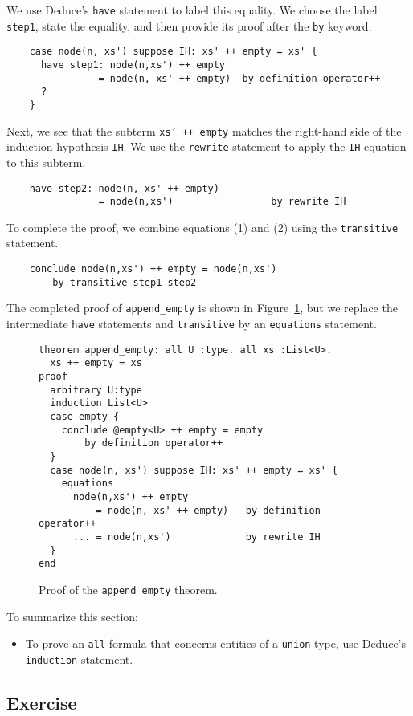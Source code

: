 \documentclass[12pt]{article}
\begin{document}
We use Deduce's \texttt{have} statement to label this equality.  We
choose the label \texttt{step1}, state the equality, and then provide
its proof after the \texttt{by} keyword.
\begin{verbatim}
    case node(n, xs') suppose IH: xs' ++ empty = xs' {
      have step1: node(n,xs') ++ empty
                = node(n, xs' ++ empty)  by definition operator++
      ?
    }
\end{verbatim}
Next, we see that the subterm \texttt{xs' ++ empty} matches the
right-hand side of the induction hypothesis \texttt{IH}. We use the
\texttt{rewrite} statement to apply the \texttt{IH} equation to this subterm.
\begin{verbatim}
    have step2: node(n, xs' ++ empty)
                = node(n,xs')                 by rewrite IH
\end{verbatim}
To complete the proof, we combine equations (1) and (2) using
the \texttt{transitive} statement.
\begin{verbatim}
    conclude node(n,xs') ++ empty = node(n,xs')
        by transitive step1 step2
\end{verbatim}

The completed proof of \texttt{append\_empty} is shown in
Figure~\ref{fig:append-empty}, but we replace the intermediate
\texttt{have} statements and \texttt{transitive} by an
\texttt{equations} statement.

\begin{figure}[tbp]
\begin{verbatim}
theorem append_empty: all U :type. all xs :List<U>.
  xs ++ empty = xs
proof
  arbitrary U:type
  induction List<U>
  case empty {
    conclude @empty<U> ++ empty = empty
        by definition operator++
  }
  case node(n, xs') suppose IH: xs' ++ empty = xs' {
    equations
      node(n,xs') ++ empty
          = node(n, xs' ++ empty)   by definition operator++
      ... = node(n,xs')             by rewrite IH
  }
end
\end{verbatim}
\caption{Proof of the \texttt{append\_empty} theorem.}
\label{fig:append-empty}
\end{figure}

To summarize this section:
\begin{itemize}
  \item To prove an \texttt{all} formula that concerns entities of a
    \texttt{union} type, use Deduce's \texttt{induction} statement.
\end{itemize}

\subsection*{Exercise}
\end{document}
